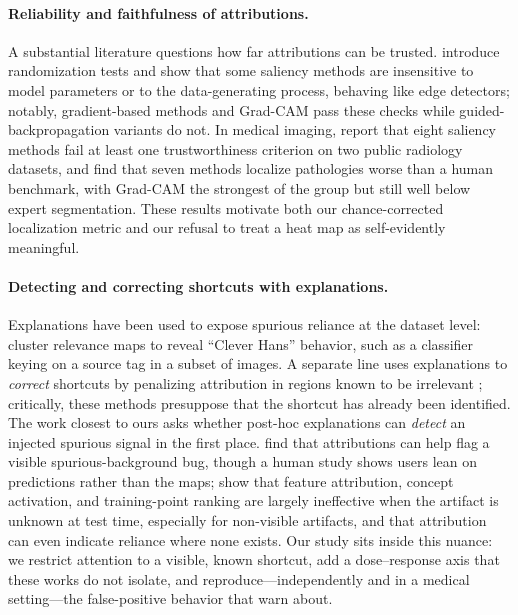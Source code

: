 \documentclass[11pt]{article}
\begin{document}
\paragraph{Reliability and faithfulness of attributions.}
A substantial literature questions how far attributions can be trusted. \citet{adebayo2018sanity}
introduce randomization tests and show that some saliency methods are insensitive to model
parameters or to the data-generating process, behaving like edge detectors; notably, gradient-based
methods and Grad-CAM pass these checks while guided-backpropagation variants do not. In medical
imaging, \citet{arun2021assessing} report that eight saliency methods fail at least one
trustworthiness criterion on two public radiology datasets, and \citet{saporta2022benchmarking}
find that seven methods localize pathologies worse than a human benchmark, with Grad-CAM the
strongest of the group but still well below expert segmentation. These results motivate both our
chance-corrected localization metric and our refusal to treat a heat map as self-evidently
meaningful.

\paragraph{Detecting and correcting shortcuts with explanations.}
Explanations have been used to expose spurious reliance at the dataset level: \citet{lapuschkin2019unmasking}
cluster relevance maps to reveal ``Clever Hans'' behavior, such as a classifier keying on a source
tag in a subset of images. A separate line uses explanations to \emph{correct} shortcuts by
penalizing attribution in regions known to be irrelevant \citep{ross2017right,rieger2020interpretations};
critically, these methods presuppose that the shortcut has already been identified. The work closest
to ours asks whether post-hoc explanations can \emph{detect} an injected spurious signal in the
first place. \citet{adebayo2020debugging} find that attributions can help flag a visible
spurious-background bug, though a human study shows users lean on predictions rather than the maps;
\citet{adebayo2022posthoc} show that feature attribution, concept activation, and training-point
ranking are largely ineffective when the artifact is unknown at test time, especially for
non-visible artifacts, and that attribution can even indicate reliance where none exists. Our study
sits inside this nuance: we restrict attention to a visible, known shortcut, add a dose--response
axis that these works do not isolate, and reproduce---independently and in a medical setting---the
false-positive behavior that \citet{adebayo2022posthoc} warn about.
\end{document}
